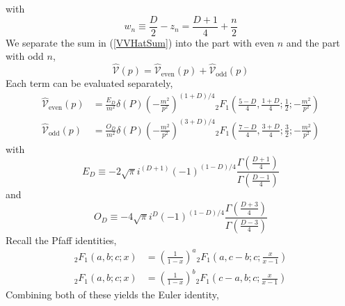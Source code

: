 with
\begin{equation}
	w_{n} \equiv \frac{D}{2} - z_{n} = \frac{D + 1}{4} + \frac{n}{2}
\end{equation}
We separate the sum in (\ref{VVHatSum}) into the part with even $n$ and the part with odd $n$,
\begin{equation}
	\widehat{\mathcal{V}}(p) = \widehat{\mathcal{V}}_{\text{even}}(p) + \widehat{\mathcal{V}}_{\text{odd}}(p)
\end{equation}
Each term can be evaluated separately,
\begin{align}
	\widehat{\mathcal{V}}_{\text{even}}(p) &= \frac{E_{D}}{m^{2}} \delta(P) \left(- \frac{m^{2}}{p^{2}} \right)^{(1 + D)/4} {}_{2} F_{1} \left( \frac{5 - D}{4}, \frac{1 + D}{4}; \frac{1}{2}; - \frac{m^{2}}{p^{2}}  \right) \label{VHatEven1} \\
	\widehat{\mathcal{V}}_{\text{odd}}(p) &=	\frac{O_{D}}{m^{2}} \delta(P) \left(- \frac{m^{2}}{p^{2}} \right)^{(3 + D)/4} {}_{2} F_{1} \left( \frac{7 - D}{4}, \frac{3 + D}{4}; \frac{3}{2}; - \frac{m^{2}}{p^{2}}  \right) \label{VHatOdd1}
\end{align}
with
\begin{equation}
	E_{D} \equiv - 2 \sqrt{\pi} i^{(D+1)} (-1)^{(1-D)/4} \frac{\Gamma\left( \frac{D + 1}{4} \right)}{\Gamma\left( \frac{D - 1}{4} \right)}
\end{equation}
and
\begin{equation}
	O_{D} \equiv - 4 \sqrt{\pi} i^{D} (-1)^{(1-D)/4} \frac{\Gamma\left( \frac{D + 3}{4} \right)}{\Gamma\left( \frac{D - 3}{4} \right)}
\end{equation}
Recall the Pfaff identities,
\begin{align}
	{}_{2} F_{1}(a, b; c; x) &= \left( \frac{1}{1 - x} \right)^{a} {}_{2} F_{1} \left( a, c-b; c; \frac{x}{x - 1} \right) \label{Pfaffa} \\
	{}_{2} F_{1}(a, b; c; x) &= \left( \frac{1}{1 - x} \right)^{b} {}_{2} F_{1} \left( c - a, b; c; \frac{x}{x - 1} \right) \label{Pfaffb}
\end{align}
Combining both of these yields the Euler identity,
